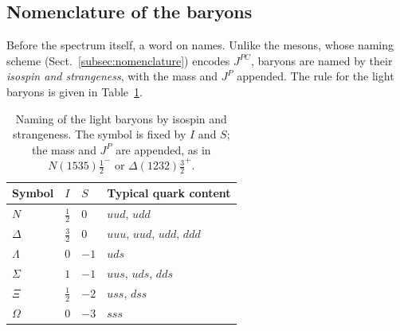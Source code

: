 
\FloatBarrier

\subsection{Nomenclature of the baryons}
\label{subsec:baryon-naming}

Before the spectrum itself, a word on names. Unlike the mesons, whose naming scheme
(Sect.~\ref{subsec:nomenclature}) encodes $J^{PC}$, baryons are named by their
\emph{isospin and strangeness}, with the mass and $J^{P}$ appended. The rule for the
light baryons is given in Table~\ref{tab:baryon-naming}.

\begin{table}[htbp]
    \centering
    \caption{Naming of the light baryons by isospin and strangeness. The symbol is fixed
    by $I$ and $S$; the mass and $J^{P}$ are appended, as in
    $N(1535)\tfrac12^{-}$ or $\Delta(1232)\tfrac32^{+}$.}
    \label{tab:baryon-naming}
    \begin{tabular}{llll}
        \hline
        Symbol & $I$ & $S$ & Typical quark content \\
        \hline
        $N$      & $\tfrac12$ & $0$  & $uud$, $udd$ \\
        $\Delta$ & $\tfrac32$ & $0$  & $uuu$, $uud$, $udd$, $ddd$ \\
        $\Lambda$& $0$        & $-1$ & $uds$ \\
        $\Sigma$ & $1$        & $-1$ & $uus$, $uds$, $dds$ \\
        $\Xi$    & $\tfrac12$ & $-2$ & $uss$, $dss$ \\
        $\Omega$ & $0$        & $-3$ & $sss$ \\
        \hline
    \end{tabular}
\end{table}

